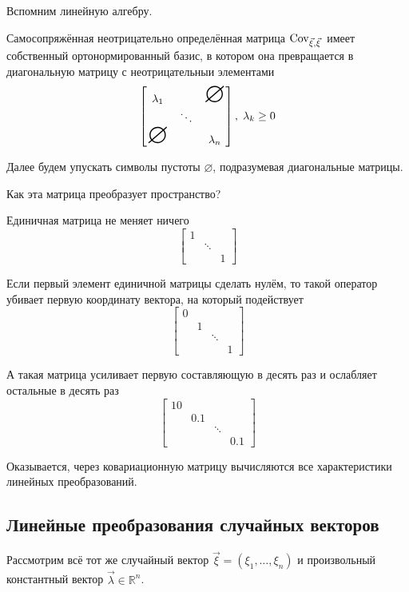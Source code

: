 \begin{remark}\label{remark:linearAlgebra:selfAdjointMatrix}
    Вспомним линейную алгебру.

    Самосопряжённая неотрицательно определённая матрица $\mathrm{Cov}_{\vec{\xi}, \vec{\xi}}\,$ имеет
    собственный ортонормированный базис, в котором она превращается в
    диагональную матрицу с неотрицательныи элементами
    $$\begin{bmatrix}
        \lambda_1 & & \mbox{\Huge{$\varnothing$}} \\
         & \ddots &  \\
         \mbox{\Huge{$\varnothing$}} & & \lambda_n
    \end{bmatrix},\; \lambda_k \ge 0$$

    Далее будем упускать символы пустоты $\varnothing$,
    подразумевая диагональные матрицы.

    Как эта матрица преобразует пространство?

    Единичная матрица не меняет ничего
    $$\begin{bmatrix}
        1 & &\\
        & \ddots & \\
        & & 1
    \end{bmatrix}$$

    Если первый элемент единичной матрицы сделать нулём, то такой оператор
    убивает первую координату вектора, на который подействует
    $$\begin{bmatrix}
        0 & & & \\
        & 1 & & \\
        & & \ddots & \\
        & & & 1
    \end{bmatrix}$$

    А такая матрица усиливает первую составляющую в десять раз и
    ослабляет остальные в десять раз
    $$\begin{bmatrix}
        10 & & &\\
        & 0.1 & & \\
        & & \ddots & \\
        & & & 0.1
    \end{bmatrix}$$

    Оказывается, через ковариационную матрицу вычисляются все характеристики
    линейных преобразований.
\end{remark}

\subsection{Линейные преобразования случайных векторов}
\label{subsection:linearTransformations}
Рассмотрим всё тот же случайный вектор $\vec{\xi} = \left( \xi_1, \dots, \xi_n
\right)$ и произвольный константный вектор $\vec{\lambda} \in \mathbb{R}^n$.

